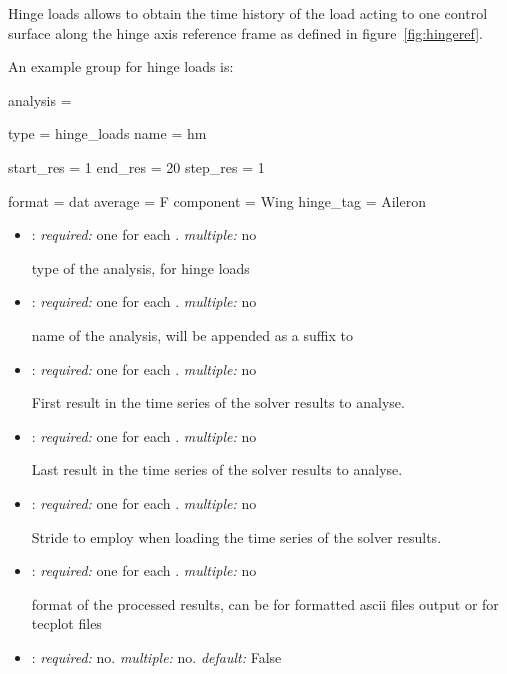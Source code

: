 Hinge loads allows to obtain the time history of the load acting to one control 
surface along the hinge axis reference frame as defined in figure~\ref{fig:hingeref}. 

An example  group for hinge loads is:

\begin{inputfile}
analysis = {
  type = hinge_loads
  name = hm

  start_res = 1
  end_res = 20
  step_res = 1

  format = dat
  average = F
  component = Wing
  hinge_tag = Aileron
}
\end{inputfile}

\begin{itemize}
\item {}: \textit{required:} one for each . \textit{multiple:} no

type of the analysis,  for hinge loads

\item {}: \textit{required:} one for each . \textit{multiple:} no

name of the analysis, will be appended as a suffix to 

\item {}: \textit{required:} one for each . \textit{multiple:} no

First result in the time series of the solver results to analyse.

\item {}: \textit{required:} one for each . \textit{multiple:} no

Last result in the time series of the solver results to analyse.

\item {}: \textit{required:} one for each . \textit{multiple:} no

Stride to employ when loading the time series of the solver results. 

\item {}: \textit{required:} one for each . \textit{multiple:} no

format of the processed results, can be  for formatted ascii files output or 
 for tecplot  files

\item {}: \textit{required:} no. \textit{multiple:} no. \textit{default:} False


\end{itemize}
